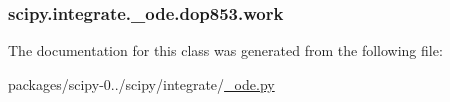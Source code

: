 \subsubsection[{work}]{\setlength{\rightskip}{0pt plus 5cm}scipy.\+integrate.\+\_\+ode.\+dop853.\+work}\label{classscipy_1_1integrate_1_1__ode_1_1dop853_abe9c63f94f7068946a91d4a8c243e220}


The documentation for this class was generated from the following file\+:\begin{DoxyCompactItemize}
\item 
packages/scipy-\/0../scipy/integrate/\hyperlink{__ode_8py}{\+\_\+ode.\+py}\end{DoxyCompactItemize}
